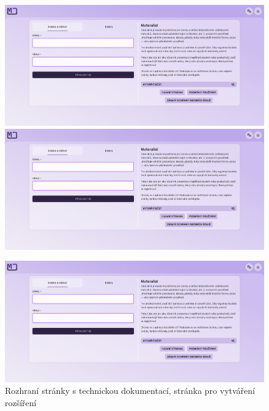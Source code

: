 \begin{figure}
\centering
\begin{minipage}{.4\textwidth}
  \centering
    \includegraphics[width=1\textwidth,page=6]{media/appendix/uzivatelskeProstredi.pdf}
\end{minipage}%
\hspace{0.1\textwidth}
\begin{minipage}{.4\textwidth}
  \centering
    \includegraphics[width=1\textwidth,page=10]{media/appendix/uzivatelskeProstredi.pdf}
\end{minipage}
\end{figure}


\begin{figure}[ht!]
    \centering
    \includegraphics[width=1\textwidth,page=8]{media/appendix/uzivatelskeProstredi.pdf}
    \caption{Rozhraní stránky s technickou dokumentací, stránka pro vytváření rozšíření}
\end{figure}


